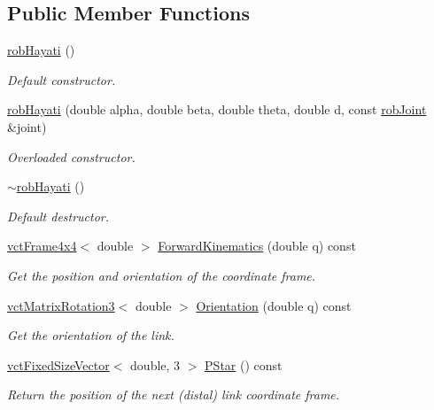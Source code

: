 \subsection*{Public Member Functions}
\begin{DoxyCompactItemize}
\item 
\hyperlink{classrob_hayati_a3d1ab57c428624dc6cf0efc8a31aa04b}{rob\+Hayati} ()
\begin{DoxyCompactList}\small\item\em Default constructor. \end{DoxyCompactList}\item 
\hyperlink{classrob_hayati_a26c86f28362457d8aac4b77f32cc4626}{rob\+Hayati} (double alpha, double beta, double theta, double d, const \hyperlink{classrob_joint}{rob\+Joint} \&joint)
\begin{DoxyCompactList}\small\item\em Overloaded constructor. \end{DoxyCompactList}\item 
\hyperlink{classrob_hayati_a7842583993380cc7534fb6b579d6e2d8}{$\sim$rob\+Hayati} ()
\begin{DoxyCompactList}\small\item\em Default destructor. \end{DoxyCompactList}\item 
\hyperlink{classvct_frame4x4}{vct\+Frame4x4}$<$ double $>$ \hyperlink{classrob_hayati_ae29971dc55363ca5a80d68cfde5b12a1}{Forward\+Kinematics} (double q) const 
\begin{DoxyCompactList}\small\item\em Get the position and orientation of the coordinate frame. \end{DoxyCompactList}\item 
\hyperlink{classvct_matrix_rotation3}{vct\+Matrix\+Rotation3}$<$ double $>$ \hyperlink{classrob_hayati_a1b06807f8d4ba90684e683ca361497b5}{Orientation} (double q) const 
\begin{DoxyCompactList}\small\item\em Get the orientation of the link. \end{DoxyCompactList}\item 
\hyperlink{classvct_fixed_size_vector}{vct\+Fixed\+Size\+Vector}$<$ double, 3 $>$ \hyperlink{classrob_hayati_af306b60415e866f652784edd0bc5b944}{P\+Star} () const 
\begin{DoxyCompactList}\small\item\em Return the position of the next (distal) link coordinate frame. \end{DoxyCompactList}\item 

\end{DoxyCompactItemize}
